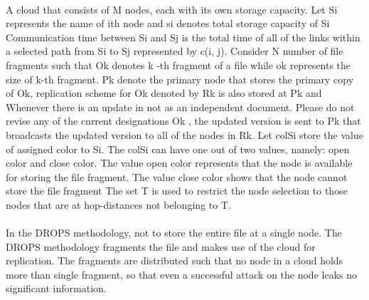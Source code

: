 \paragraph{}
A cloud that consists of M nodes, each with its own storage capacity. Let Si represents
the name of ith node and si denotes total storage capacity of Si Communication time
between Si and Sj is the total time of all of the links within a selected path from Si to Sj
represented by c(i, j). Consider N number of file fragments such that Ok denotes k -th
fragment of a file while ok represents the size of k-th fragment. Pk denote the primary
node that stores the primary copy of Ok, replication scheme for Ok denoted by Rk is also
stored at Pk and Whenever there is an update in not as an independent document. Please
do not revise any of the current designations Ok , the updated version is sent to Pk that
broadcasts the updated version to all of the nodes in Rk. Let colSi store the value of
assigned color to Si. The colSi can have one out of two values, namely: open color and
close color. The value open color represents that the node is available for storing the file
fragment. The value close color shows that the node cannot store the file fragment The
set T is used to restrict the node selection to those nodes that are at hop-distances not
belonging to T.
\paragraph*{}
In the DROPS methodology, not to store the entire file at a single node. The DROPS
methodology fragments the file and makes use of the cloud for replication. The fragments
are distributed such that no node in a cloud holds more than single fragment, so that even
a successful attack on the node leaks no significant information.

